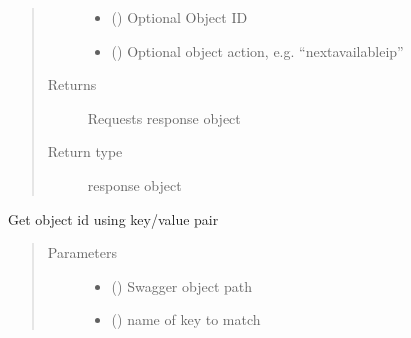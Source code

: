 \documentclass[letterpaper,10pt,english]{sphinxmanual}
\begin{document}
\begin{fulllineitems}
\begin{fulllineitems}
\begin{quote}
\begin{description}
\begin{itemize}
\item {} 
\sphinxAtStartPar
{} () \textendash{} Optional Object ID

\item {} 
\sphinxAtStartPar
{} () \textendash{} Optional object action, e.g. “nextavailableip”

\end{itemize}

\item[{Returns}] \leavevmode
\sphinxAtStartPar
Requests response object

\item[{Return type}] \leavevmode
\sphinxAtStartPar
response object

\end{description}\end{quote}

\end{fulllineitems}


\begin{fulllineitems}
\label{\detokenize{b1anycast-class:bloxone.b1anycast.get_id}}
\sphinxAtStartPar
Get object id using key/value pair
\begin{quote}\begin{description}
\item[{Parameters}] \leavevmode\begin{itemize}
\item {} 
\sphinxAtStartPar
{} () \textendash{} Swagger object path

\item {} 
\sphinxAtStartPar
{} () \textendash{} name of key to match


\end{itemize}
\end{description}
\end{quote}
\end{fulllineitems}
\end{fulllineitems}
\end{document}
